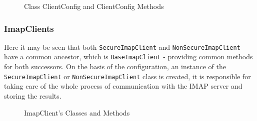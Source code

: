 \documentclass[a4paper,11pt]{article}
\begin{document}
\begin{figure}[H]
    \centering
    \caption{Class ClientConfig and ClientConfig Methods}
    \label{figure:client-config}
\end{figure}

\newpage

\subsubsection{ImapClients}
Here it may be seen that both \verb!SecureImapClient! and \verb!NonSecureImapClient! 
have a common ancestor, which is \verb!BaseImapClient! - providing common methods for 
both successors. On the basis of the configuration, an instance of the \verb!SecureImapClient! 
or \verb!NonSecureImapClient! class is created, it is responsible for taking care of 
the whole process of communication with the IMAP server and storing the results.

\begin{figure}[H]
    \centering
    \caption{ImapClient's Classes and Methods}
    \label{figure:imap-clients}
\end{figure}
\end{document}
